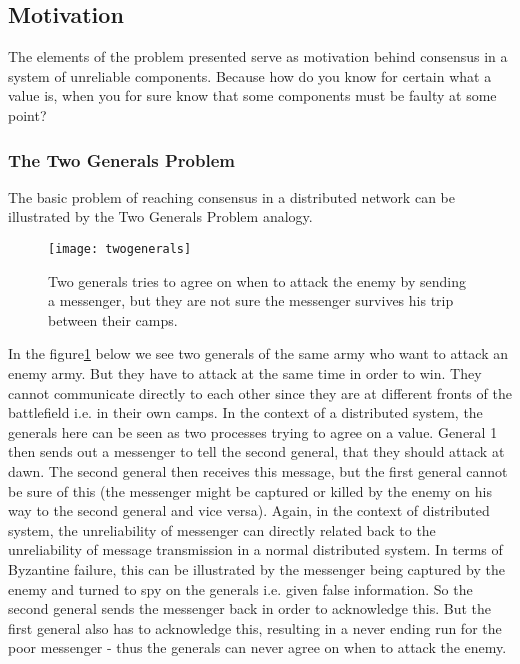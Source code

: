 \subsection{Motivation}
The elements of the problem presented serve as motivation behind consensus in a system of unreliable components. Because how do you know for certain what a value is, when you for sure know that some components must be faulty at some point?
\subsubsection{The Two Generals Problem}
The basic problem of reaching consensus in a distributed network can be illustrated by the Two Generals Problem analogy.
\begin{figure}[h]
	\centering
	\texttt{[image: twogenerals]}
	\caption{Two generals tries to agree on when to attack the enemy by sending a messenger, but they are not sure the messenger survives his trip between their camps.}
	\label{generals}
\end{figure}
In the figure\ref{generals} below we see two generals of the same army who want to attack an enemy army. But they have to attack at the same time in order to win. They cannot communicate directly to each other since they are at different fronts of the battlefield i.e. in their own camps. In the context of a distributed system, the generals here can be seen as two processes trying to agree on a value.
General 1 then sends out a messenger to tell the second general, that they should attack at dawn. The second general then receives this message, but the first general cannot be sure of this (the messenger might be captured or killed by the
enemy on his way to the second general and vice versa). Again, in the context of distributed system, the unreliability of messenger can directly related back to the unreliability of message transmission in a normal distributed system. In terms of Byzantine failure, this can be illustrated by the messenger being captured by the enemy and turned to spy on the generals i.e. given false information.
So the second general sends the messenger back in order to acknowledge this. But the first general also has to acknowledge this, resulting in a never ending run for the poor messenger - thus the generals can never agree on when to attack the enemy.

